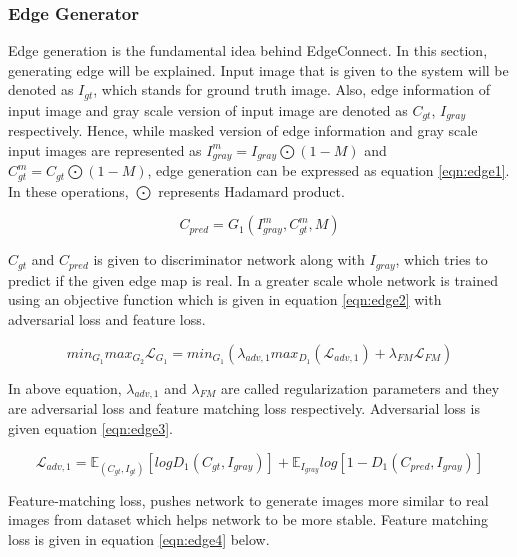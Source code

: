 \subsubsection{Edge Generator}

Edge generation is the fundamental idea behind EdgeConnect. In this section, generating edge will be explained.
Input image that is given to the system will be denoted as \(I_{gt}\), which stands for ground truth image. Also, edge information of input image and gray scale version of input image are denoted as \(C_{gt}\), \(I_{gray}\) respectively. Hence, while masked version of edge information and gray scale input images are represented as \(I^m_{gray}=I_{gray} \bigodot (1-M)\)  and \(C^m_{gt}=C_{gt}\bigodot(1-M)\), edge generation can be expressed as equation \ref{eqn:edge1}. In these operations, \(\bigodot\) represents Hadamard product.

\begin{equation}
\label{eqn:edge1}
    C_{pred} = G_{1}(I^{m}_{gray}, C^{m}_{gt}, M)
\end{equation}

\(C_{gt}\) and \(C_{pred}\) is given to discriminator network along with \(I_{gray}\), which tries to predict if the given edge map is real. In a greater scale whole network is trained using an objective function which is given in equation \ref{eqn:edge2} with adversarial loss and feature loss.

\begin{equation}
\label{eqn:edge2}
    min_{G_{1}}max_{G_{2}}\mathcal{L}_{G_{1}} = min_{G_{1}}(\lambda_{adv,1}max_{D_{1}}(\mathcal{L}_{adv,1})+\lambda_{FM} \mathcal{L}_{FM})
\end{equation}

In above equation, \(\lambda_{adv,1}\) and \(\lambda_{FM}\) are called regularization parameters and they are adversarial loss and feature matching loss respectively. Adversarial loss is given equation \ref{eqn:edge3}.

\begin{equation}
\label{eqn:edge3}
    \mathcal{L}_{adv,1} = \mathbb{E}_{(C_{gt},I_{gt})}[logD_{1}(C_{gt},I_{gray})]+\mathbb{E}_{I_{gray}}log[1-D_{1} (C_{pred}, I_{gray})]
\end{equation}

Feature-matching loss, pushes network to generate images more similar to real images from dataset which helps network to be more stable. Feature matching loss is given in equation \ref{eqn:edge4} below.

